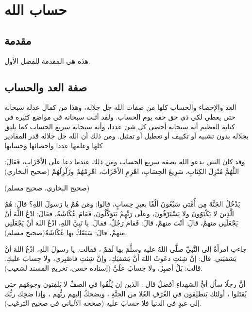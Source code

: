 \chapter{حساب الله}

\section{مقدمة}
هذه هي المقدمة للفصل الأول.



\section{صفة العد والحساب}

العد والإحصاء والحساب كلها من صفات الله جل جلاله، وهذا من كمال عدله سبحانه حتى يعطي لكي ذي حق حقه يوم الحساب. ولقد أثبت سبحانه في مواضع كثيره في كتابه العظيم أنه سبحانه أحصى كل شئ عددا، وأنه سبحانه سريع الحساب كما يليق بجلاله بدون تشبيه أو تكييف أو تعطيل أو تمثيل. ومن ذلك أن الله جل جلاله قدر المقادير كلها وعلمها عددا واحصائها وحسابها

\quranayah*[9][111]{\footnotesize \surahname*[9]}


وقد كان النبي يدعو الله بصفة سريع الحساب ومن ذلك عندما دعا علَى الأحْزَابِ، فَقالَ: اللَّهُمَّ مُنْزِلَ الكِتَابِ، سَرِيعَ الحِسَابِ، اهْزِمِ الأحْزَابَ، اهْزِمْهُمْ وزَلْزِلْهُمْ {\footnotesize (صحيح البخاري)}

{\footnotesize (صحيح البخاري، صحيح مسلم)}

يَدْخُلُ الجَنَّةَ مِن أُمَّتي سَبْعُونَ ألْفًا بغيرِ حِسابٍ، قالوا: ومَن هُمْ يا رَسولَ اللهِ؟ قالَ: هُمُ الَّذِينَ لا يَكْتَوُونَ ولا يَسْتَرْقُونَ، وعلَى رَبِّهِمْ يَتَوَكَّلُونَ، فَقامَ عُكّاشَةُ، فقالَ: ادْعُ اللَّهَ أنْ يَجْعَلَنِي منهمْ، قالَ: أنْتَ منهمْ، قالَ: فَقامَ رَجُلٌ، فقالَ: يا نَبِيَّ اللهِ، ادْعُ اللهَ أنْ يَجْعَلَنِي منهمْ، قالَ: سَبَقَكَ بها عُكّاشَةُ{\footnotesize (صحيح مسلم)}.


جاءتِ امرأَةٌ إلى النَّبيِّ صلَّى اللهُ عليه وسلَّمَ بها لَمَمٌ ، فقالت: يا رسولَ اللهِ، ادْعُ اللهَ أنْ يَشفيَني. قال: إنْ شِئتِ دعَوتُ اللهَ أنْ يَشفيَكِ، وإنْ شِئتِ فاصْبِري، ولا حِسابَ عليكِ. قالت: بَلْ أصبِرُ، ولا حِسابَ علَيَّ {\footnotesize (إسناده حسن، تخريج المسند لشعيب)}.


أنَّ رجلًا سأل أيُّ الشهداءِ أفضلُ قال : الذين إن يُلْقُوا في الصفِّ لا يَلفِتون وجوهَهم حتى يُقتَلوا ، أولئك يَنطلِقون في الغُرَفِ العُلا من الجنَّةِ ، ويضحكُ إليهم ربُّهم ، وإذا ضحِك ربُّك إلى عبدٍ في الدنيا فلا حسابَ عليه 
{\footnotesize (صححه الألباني في صحيح الترغيب)}.

